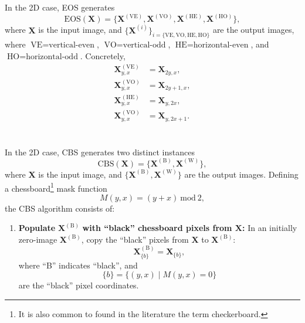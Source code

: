 \begin{subappendices}

\section{}
\label{sec:EOS}

In the 2D case, \acrshort{EOS} generates
\begin{equation}
  \mathrm{EOS}(\mathbf{X})=\{\mathbf{X}^{(\text{VE})}, \mathbf{X}^{(\text{VO})}, \mathbf{X}^{(\text{HE})}, \mathbf{X}^{(\text{HO})}\},
\end{equation}
where $\mathbf{X}$ is the input image, and $\{\mathbf{X}^{(i)}\}_{i=\{\text{VE}, \text{VO}, \text{HE}, \text{HO}\}}$
  are the output images, where $\text{VE}=\text{vertical-even}$,
  $\text{VO}=\text{vertical-odd}$, $\text{HE}=\text{horizontal-even}$,
  and $\text{HO}=\text{horizontal-odd}$. Concretely,
  \begin{align}
    \mathbf{X}^{(\text{VE})}_{y,x} & = \mathbf{X}_{2y,x}, \\
    \mathbf{X}^{(\text{VO})}_{y,x} & = \mathbf{X}_{2y+1,x}, \\
    \mathbf{X}^{(\text{HE})}_{y,x} & = \mathbf{X}_{y,2x},\\
    \mathbf{X}^{(\text{VO})}_{y,x} & = \mathbf{X}_{y,2x+1}.
  \end{align}
  

\section{}
\label{sec:CBS}

In the 2D case, \gls{CBS} generates two distinct
instances
\begin{equation}
  \mathrm{CBS}(\mathbf{X})=\{\mathbf{X}^{(\text{B})},\mathbf{X}^{(\text{W})}\},
\end{equation}
where $\mathbf{X}$ is the input image, and
$\{\mathbf{X}^{(\text{B})},\mathbf{X}^{(\text{W})}\}$ are the output
images. Defining a chessboard\footnote{It is also common to found in
  the literature the term checkerboard.} mask function
\begin{equation}
  M(y,x)=(y+x)~\text{mod}~2,
\end{equation}
the CBS algorithm consists of:
\begin{enumerate}
\item \textbf{Populate} $\mathbf{X}^{(\text{B})}$ \textbf{with
    ``black'' chessboard pixels from $\mathbf{X}$:} In an initially
  zero-image $\mathbf{X}^{(\text{B})}$, copy the ``black'' pixels from
  $\mathbf{X}$ to $\mathbf{X}^{(\text{B})}$:
  \begin{equation}
    \mathbf{X}^{(\text{B})}_{\{b\}} = \mathbf{X}_{\{b\}},
    \label{eq:copy_blacks}
  \end{equation}
  where ``B'' indicates ``black'', and
  \begin{equation}
    \{b\} = \{(y, x) \mid M(y, x)=0\}
    \label{eq:black_pixels}
  \end{equation}
  are the ``black'' pixel coordinates.
  

\end{enumerate}
\end{subappendices}
